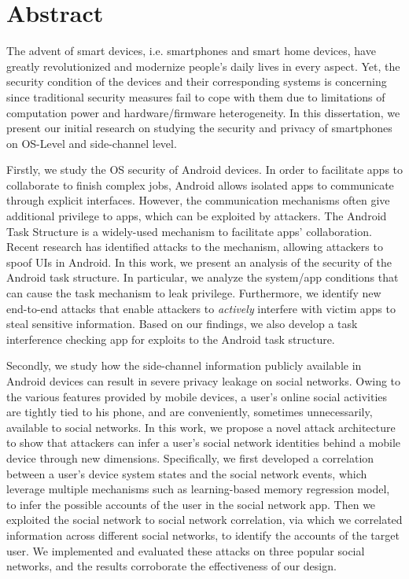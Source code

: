 \documentclass[letterpaper,12pt]{article}
\begin{document}
   \newpage
      \section{Abstract}
   The advent of smart devices, i.e. smartphones and smart home devices, have greatly revolutionized and modernize people's daily lives in every aspect. Yet, the security condition of the devices and their corresponding systems is concerning since traditional security measures fail to cope with them due to limitations of computation power and hardware/firmware heterogeneity. In this dissertation, we present our initial research on studying the security and privacy of smartphones on OS-Level and side-channel level.
   
   Firstly, we study the OS security of Android devices. In order to facilitate apps to collaborate to finish complex jobs, Android allows isolated apps to communicate through explicit interfaces. However, the communication mechanisms often give additional privilege to apps, which can be exploited by attackers. The Android Task Structure is a widely-used mechanism to facilitate apps' collaboration. Recent research has identified attacks to the mechanism, allowing attackers to spoof UIs in Android. In this work, we present an analysis of the security of the Android task structure. In particular, we analyze the system/app conditions that can cause the task mechanism to leak privilege. Furthermore, we identify new end-to-end attacks that enable attackers to {\em actively} interfere with victim apps to steal sensitive information. Based on our findings, we also develop a task interference checking app for exploits to the Android task structure.
   
    Secondly, we study how the side-channel information publicly available in Android devices can result in severe privacy leakage on social networks. Owing to the various features provided by mobile devices, a user's online social activities are tightly tied to his phone, and are conveniently, sometimes unnecessarily, available to social networks. In this work, we propose a novel attack architecture to show that attackers can infer a user's social network identities behind a mobile device through new dimensions. Specifically, we first developed a correlation between a user's device system states and the social network events, which leverage multiple mechanisms such as learning-based memory regression model, to infer the possible accounts of the user in the social network app. Then we exploited the social network to social network correlation, via which we correlated information across different social networks, to identify the accounts of the target user. We implemented and evaluated these attacks on three popular social networks, and the results corroborate the effectiveness of our design.
    
\end{document}
